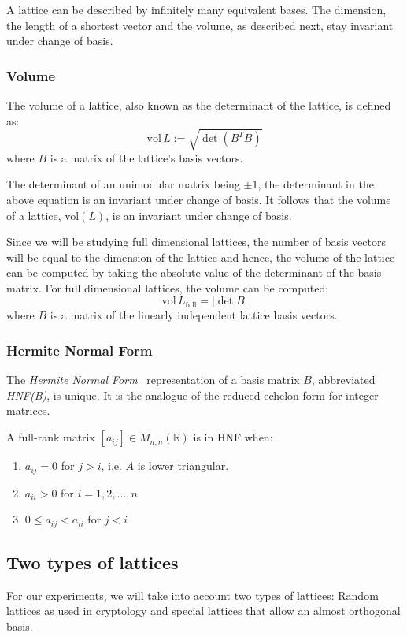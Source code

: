 \documentclass[10pt, a4paper]{article}
\begin{document}
A lattice can be described by infinitely many equivalent bases. The dimension, the length of a shortest vector and the volume, as described next, stay invariant under change of basis.
\subsubsection{Volume}

The volume of a lattice, also known as the determinant of the lattice, is defined as:
\[
\text{vol} \,L := \sqrt{\det(B^T B)}
\] where $B$ is a matrix of the lattice's basis vectors.

The determinant of an unimodular matrix being $\pm 1$, the determinant in the above equation is an invariant under change of basis. It follows that the volume of a lattice, vol$(L)$, is an invariant under change of basis.

Since we will be studying full dimensional lattices, the number of basis vectors will be equal to the dimension of the lattice and hence, the volume of the lattice can be computed by taking the absolute value of the determinant of the basis matrix.
For full dimensional lattices, the volume can be computed:
\[
\text{vol} \,L_{\text{full}} = |\det B|
\] where $B$ is a matrix of the linearly independent lattice basis vectors.



\subsubsection{Hermite Normal Form}

The \emph{Hermite Normal Form}~\cite{SchnorrStanfordNotes} representation of a basis matrix $B$, abbreviated \emph{HNF(B)}, is unique. It is the analogue of the reduced echelon form for integer matrices.

A full-rank matrix $[a_{ij}] \in M_{n,n} (\mathbb{R})$ is in HNF when:
\begin{enumerate}
\item $a_{ij} = 0$ for $j > i$, i.e. $A$ is lower triangular. 
\item $a_{ii} > 0$ for $i=1,2,...,n$
\item $0 \leq a_{ij} < a_{ii}$ for $j < i$
\end{enumerate}

\subsection{Two types of lattices}
For our experiments, we will take into account two types of lattices: Random lattices as used in cryptology and special lattices that allow an almost orthogonal basis.
\end{document}
